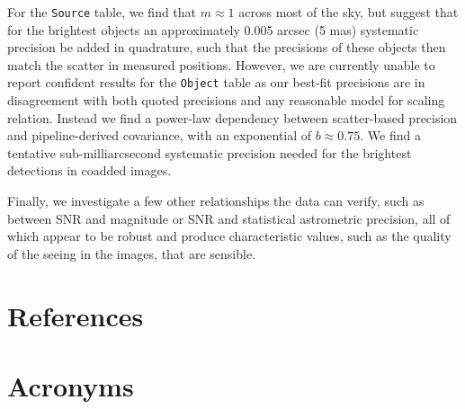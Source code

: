 \documentclass[SE,lsstdraft,authoryear,toc]{lsstdoc}
\begin{document}
For the \texttt{Source} table, we find that $m \approx 1$ across most of the sky, but suggest that for the brightest objects an approximately 0.005 arcsec (5 mas) systematic precision be added in quadrature, such that the precisions of these objects then match the scatter in measured positions.
However, we are currently unable to report confident results for the \texttt{Object} table as our best-fit precisions are in disagreement with both quoted precisions and any reasonable model for scaling relation.
Instead we find a power-law dependency between scatter-based precision and pipeline-derived covariance, with an exponential of $b \approx 0.75$.
We find a tentative sub-milliarcsecond systematic precision needed for the brightest detections in coadded images.

Finally, we investigate a few other relationships the data can verify, such as between SNR and magnitude or SNR and statistical astrometric precision, all of which appear to be robust and produce characteristic values, such as the quality of the seeing in the images, that are sensible.

\appendix
\section{References} \label{sec:bib}
\renewcommand{\refname}{} %


\section{Acronyms} \label{sec:acronyms}

\end{document}

